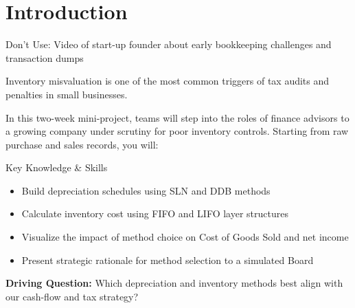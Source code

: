 \section{Introduction}
\begin{Replace}
Don't Use: Video of start-up founder about early bookkeeping challenges and transaction dumps
\end{Replace}

\begin{Trivia}
Inventory misvaluation is one of the most common triggers of tax audits and penalties in small businesses.
\end{Trivia}

In this two-week mini-project, teams will step into the roles of finance advisors to a growing company under scrutiny for poor inventory controls. Starting from raw purchase and sales records, you will:

\begin{skillbox}{Key Knowledge \& Skills}
\begin{itemize}
  \item Build depreciation schedules using SLN and DDB methods
  \item Calculate inventory cost using FIFO and LIFO layer structures
  \item Visualize the impact of method choice on Cost of Goods Sold and net income
  \item Present strategic rationale for method selection to a simulated Board
\end{itemize}
\end{skillbox}

\begin{Important}
\textbf{Driving Question:} Which depreciation and inventory methods best align with our cash-flow and tax strategy?
\end{Important}


\clearpage
